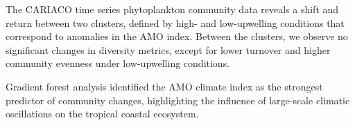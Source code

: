 \documentclass[draft]{agujournal2019}
\begin{document}






\begin{keypoints}
\item The CARIACO time series phytoplankton community data reveals a shift and return between two clusters, defined by high- and low-upwelling conditions that correspond to anomalies in the AMO index. 
\index Between the clusters, we observe no significant changes in diversity metrics, except for lower turnover and higher community evenness under low-upwelling conditions.
\item Gradient forest analysis identified the AMO climate index as the strongest predictor of community changes, highlighting the influence of large-scale climatic oscillations on the tropical coastal ecosystem.
\end{keypoints}

%
%

%
%
\end{document}
